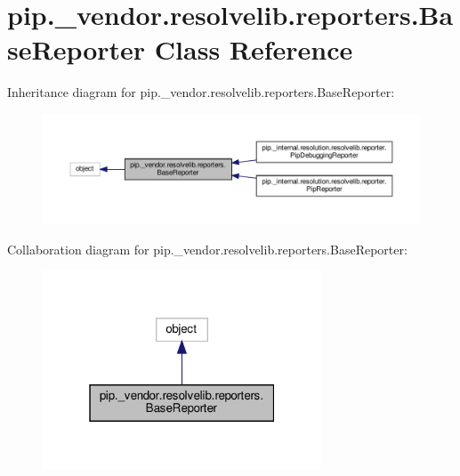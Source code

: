 \hypertarget{classpip_1_1__vendor_1_1resolvelib_1_1reporters_1_1BaseReporter}{}\section{pip.\+\_\+vendor.\+resolvelib.\+reporters.\+Base\+Reporter Class Reference}
\label{classpip_1_1__vendor_1_1resolvelib_1_1reporters_1_1BaseReporter}


Inheritance diagram for pip.\+\_\+vendor.\+resolvelib.\+reporters.\+Base\+Reporter\+:
\nopagebreak
\begin{figure}[H]
\begin{center}
\leavevmode
\includegraphics[width=350pt]{classpip_1_1__vendor_1_1resolvelib_1_1reporters_1_1BaseReporter__inherit__graph}
\end{center}
\end{figure}


Collaboration diagram for pip.\+\_\+vendor.\+resolvelib.\+reporters.\+Base\+Reporter\+:
\nopagebreak
\begin{figure}[H]
\begin{center}
\leavevmode
\includegraphics[width=235pt]{classpip_1_1__vendor_1_1resolvelib_1_1reporters_1_1BaseReporter__coll__graph}
\end{center}
\end{figure}

